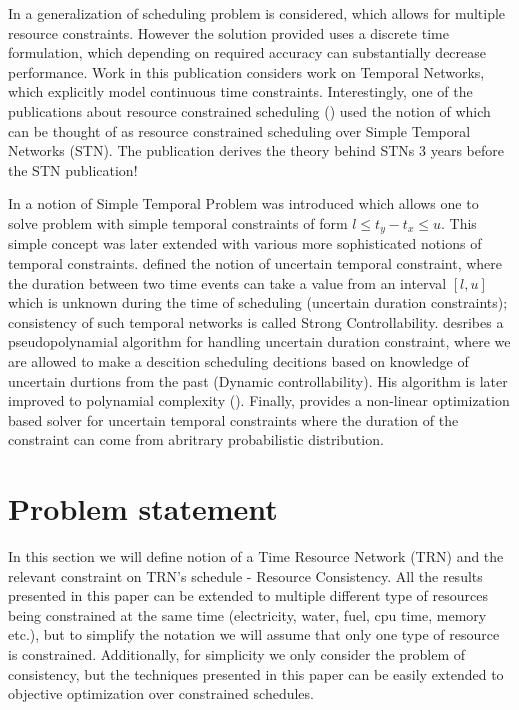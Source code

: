 \documentclass{article}
\begin{document}
\begin{multicols}{2}
In \cite{pritsker1969multiproject} a generalization of scheduling problem is considered, which allows for multiple resource constraints. However the solution provided uses a discrete time formulation, which depending on required accuracy can substantially decrease performance. Work in this publication considers work on Temporal Networks, which explicitly model continuous time constraints. Interestingly, one of the publications about resource constrained scheduling (\cite{bartusch1988scheduling}) used the notion of which can be thought of as resource constrained scheduling over Simple Temporal Networks (STN). The publication derives the theory behind STNs 3 years before the STN publication!

In \cite{dechter1991temporal} a notion of Simple Temporal Problem was introduced which allows one to solve problem with simple temporal constraints of form $l \leq t_y - t_x \leq u$. This simple concept was later extended with various more sophisticated notions of temporal constraints. \cite{vidal1996dealing} defined the notion of uncertain temporal constraint, where the duration between two time events can take a value from an interval $[l,u]$ which is unknown during the time of scheduling (uncertain duration constraints); consistency of such temporal networks is called Strong Controllability. \cite{morris2001dynamic} desribes a pseudopolynamial algorithm for handling uncertain duration constraint, where we are allowed to make a descition scheduling decitions based on knowledge of uncertain durtions from the past (Dynamic controllability). His algorithm is later improved to polynamial complexity (\cite{morris2005temporal}). Finally, \cite{Fang2014} provides a non-linear optimization based solver for uncertain temporal constraints where the duration of the constraint can come from abritrary probabilistic distribution.

\section{Problem statement}
In this section we will define notion of a Time Resource Network (TRN) and the relevant constraint on TRN's schedule - Resource Consistency. All the results presented in this paper can be extended to multiple different type of resources being constrained at the same time (electricity, water, fuel, cpu time, memory etc.), but to simplify the notation we will assume that only one type of resource is constrained. Additionally, for simplicity we only consider the problem of consistency, but the techniques presented in this paper can be easily extended to objective optimization over constrained schedules.

\end{multicols}
\end{document}
